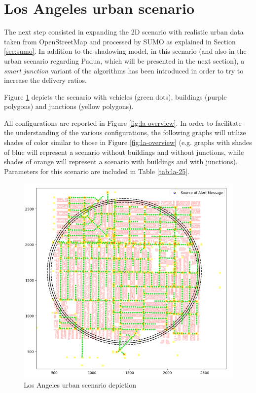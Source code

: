 	\section{Los Angeles urban scenario}
		\label{sec:la-scenario}
		The next step consisted in expanding the 2D scenario with realistic urban data taken from OpenStreetMap and processed by SUMO as explained in Section \ref{sec:sumo}. In addition to the shadowing model, in this scenario (and also in the urban scenario regarding Padua, which will be presented in the next section), a \textit{smart junction} variant of the algorithms has been introduced in order to try to increase the delivery ratios. 
		
		Figure \ref{fig:la-scenario} depicts the scenario with vehicles (green dots), buildings (purple polygons) and junctions (yellow polygons).
		
		
		All configurations are reported in Figure \ref{fig:la-overview}. In order to facilitate the understanding of the various configurations, the following graphs will utilize shades of color similar to those in Figure \ref{fig:la-overview} (e.g. graphs with shades of blue will represent a scenario without buildings and without junctions, while shades of orange will represent a scenario with buildings and with junctions). Parameters for this scenario are included in Table \ref{tab:la-25}.  
		
		\begin{figure}[H]
			\centering
			\includegraphics[width=1.0\textwidth]{immagini/la-25/la-scenario}
			\caption{Los Angeles urban scenario depiction}
			\label{fig:la-scenario}
		\end{figure}
		
